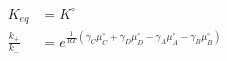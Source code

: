 \begin{eqnarray}
 K_{eq} & = K^\circ \\
\frac{k_+}{k_-} & = e^{\frac{1}{RT}\left(\gamma_C\mu_C^\circ+ \gamma_D\mu_D^\circ -\gamma_A\mu_A^\circ-\gamma_B\mu_B^\circ\right)} \\
\end{eqnarray}